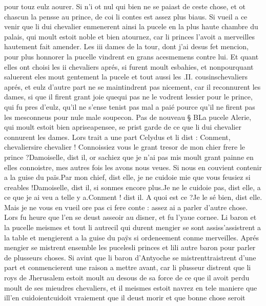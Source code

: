 \documentclass{article}
\begin{document}
\begin{pages}
   pour touz eulz aourer. Si n’i ot nul qui bien ne se paiast de ceste chose, et ot chascun la pensse au 
   prince, de coi li contes est assez plus biaus. 
   Si vueil a ce venir que li dui chevalier enmenerent ainsi la pucele 
   en la plus haute chambre du palais, qui moult estoit noble 
   et bien atournez, car li princes l'avoit a merveilles hautement fait amender. \pend 
\pstart Les iii dames de 
   la tour, 
   dont j’ai desus fet mencion, pour plus honnorer la pucelle vindrent 
   en grans acesmemens contre lui. Et quant elles ont choisi les ii chevaliers 
   aprés, si furent moult esbahies, et nonpourquant saluerent eles mout
   gentement la pucele et tout aussi les .II. cousinschevaliers aprés, 
   et eulz d’autre part ne se maintindrent pas nicement, car il reconnurent les dames, si que il firent grant joie 
   quequi pas ne le vodrent lessier pour 
   le prince, qui fu pres d’eulz, qu’il ne 
   s’ense tenist pas mal a paié pource 
      qu’il ne firent pas les mesconneus pour nule male soupecon. \pend
\pstart Pas de nouveau § BLa pucele Alerie, 
   qui moult estoit bien apriseapensee, 
   se prist garde de ce que li dui chevalier connurent les dames. Lors trait a une part Celydus et li dist :
   Conment, chevaliersire chevalier ! 
      Connoissiez vous le grant tresor de mon chier frere le prince ?Damoiselle, dist il, or sachiez que je n’ai pas mis moult grant painne en elles connoistre, 
   mes autres fois les avons nous veues. Si nous en couvient contenir a la guise du païs.Par mon chief, dist elle, je ne cuidoie mie que vous feusiez si creables !Damoiselle, dist il, si sonmes encore plus.Je ne le cuidoie pas, dist elle, a ce que je ai veu a telle y a.Conment ! dist il. A quoi est ce ?Je le sé bien, dist elle. Mais je ne vous en 
      vueil ore pas ci fere conte : assez ai a parler d’autre chose.
   Lors fu heure que l’en se deust asseoir au disner, et fu l’yaue cornee. Li baron et 
   la pucelle meismes et tout 
      li autrecil qui durent mengier 
   se sont assiss'assistrent a la table 
   et mengierent a la guise du paÿs 
   si ordeneement conme merveilles. Aprés mengier se mistrent ensemble 
   les pucelesli princes et 
   lili autre baron pour parler de plusseurs choses. 
   Si avint que li baron d’Antyoche se 
   mistrenttraistrent d’une part et conmencierent une raison 
   a mettre avant, car li plusseur distrent que 
   li roys de Jherusalem 
   estoit moult au desous de sa force de ce que il avoit perdu moult de ses mieudres chevaliers, et il meismes estoit navrez en tele 
   maniere que ill'en 
      cuidoientcuidoit vraiement que il deust morir et que bonne chose seroit 

\end{pages}
\end{document}
